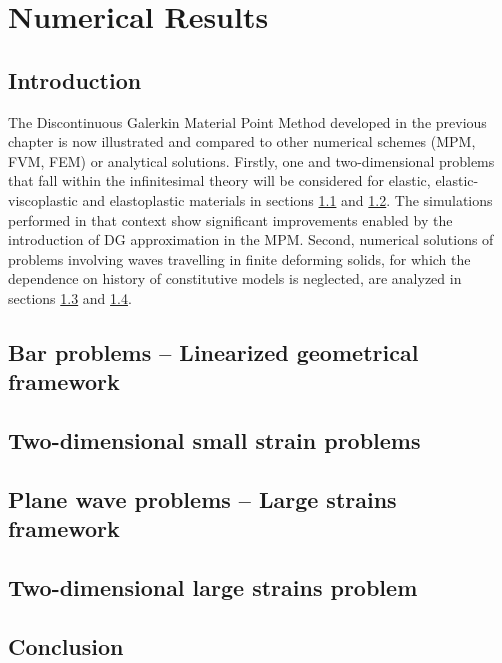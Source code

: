 \chapter{Numerical Results}
\section*{Introduction}
The Discontinuous Galerkin Material Point Method developed in the previous chapter is now illustrated and compared to other numerical schemes (MPM, FVM, FEM) or analytical solutions. 
Firstly, one and two-dimensional problems that fall within the infinitesimal theory will be considered for elastic, elastic-viscoplastic and elastoplastic materials in sections \ref{sec:1dhpp_simulations} and \ref{sec:2dhpp_simulations}. The simulations performed in that context show significant improvements enabled by the introduction of DG approximation in the MPM. Second, numerical solutions of problems involving waves travelling in finite deforming solids, for which the dependence on history of constitutive models is neglected, are analyzed in sections \ref{sec:1dhe_simulations} and \ref{sec:2dhe_simulations}.


\section{Bar problems -- Linearized geometrical framework}
\label{sec:1dhpp_simulations}
%

\section{Two-dimensional small strain problems}
\label{sec:2dhpp_simulations}



\section{Plane wave problems -- Large strains framework}
\label{sec:1dhe_simulations}


\section{Two-dimensional large strains problem}
\label{sec:2dhe_simulations}


\section{Conclusion}
